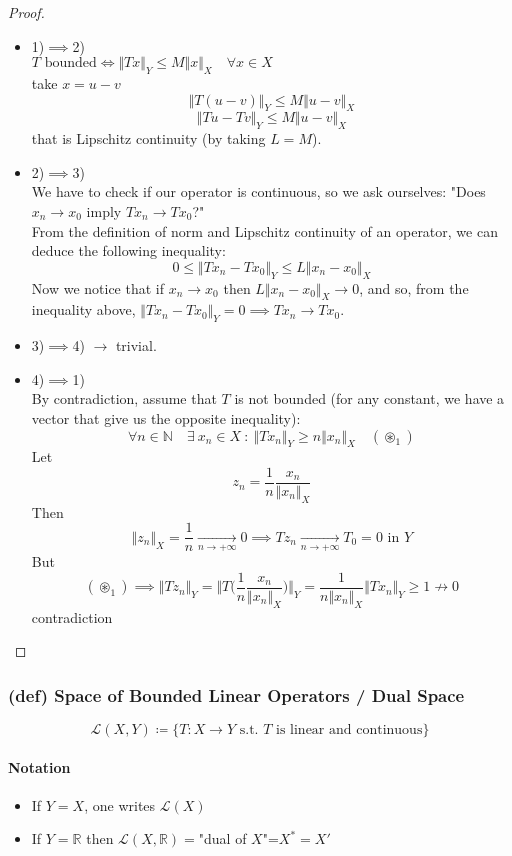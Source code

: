 \begin{proof}\
    \begin{itemize}
        \item  1)$\implies$2) \\$T \text{ bounded}\iff \Vert Tx\Vert _Y\leq M\Vert x\Vert _X\quad \forall x\in X$\\ take $x=u-v$
        $$\Vert T(u-v)\Vert_Y\leq M\Vert u-v\Vert _X$$
        $$\Vert Tu-Tv\Vert_Y\leq M\Vert u-v\Vert _X$$
        that is Lipschitz continuity (by taking $L=M$).
        \item 2)$\implies$3) \\
        We have to check if our operator is continuous, so we ask ourselves: "Does $x_n\to x_0$ imply $Tx_n\to Tx_0$?"\\
        From the definition of norm and Lipschitz continuity of an operator, we can deduce the following inequality:
        $$0\leq\Vert Tx_n-T x_0\Vert_Y \leq L\Vert x_n-x_0\Vert_X$$
        Now we notice that if $x_n\to x_0$ then $L\Vert x_n-x_0\Vert_X\to 0$, and so, from the inequality above, $\Vert Tx_n-T x_0\Vert_Y=0 \implies Tx_n\to Tx_0$.
        \item 3)$\implies$4) $\to $ trivial.
        \item 4)$\implies$1)\\
        By contradiction, assume that $T$ is not bounded (for any constant, we have a vector that give us the opposite inequality):
        $$\forall n\in \mathbb N\quad \exists\ x_n\in X\ : \ \Vert Tx_n\Vert_Y\geq n\Vert x_n\Vert _X \quad (\circledast_1)$$
        Let $$z_n= \frac 1n\frac{x_n}{\Vert x_n\Vert_X}$$
        Then 
        $$\Vert z_n\Vert _X=\frac 1n\xrightarrow[n\to+\infty]{} 0\implies Tz_n \xrightarrow[n\to+\infty]{}T_0=0 \text{ in }Y$$
        But $$(\circledast_1)\implies \Vert Tz_n\Vert_Y=\Big\Vert T\Big(\frac 1n \frac{x_n}{\Vert x_n\Vert_X}\Big)\Big\Vert_Y=\frac{1}{n\Vert x_n\Vert_X}\Vert T x_n\Vert_Y\geq 1 \not \to 0$$
        contradiction
        
    \end{itemize}
\end{proof}
\subsubsection{(def) Space of Bounded Linear Operators / Dual Space}
$$\mathcal L(X,Y)\coloneqq \Big\{ T:X\to Y \text{ s.t. } T \text{ is linear and continuous}\Big\}$$
\paragraph{Notation}
\begin{itemize}
    \item If $Y=X$, one writes $\mathcal L(X)$
    \item If $Y=\mathbb R$ then $\mathcal L(X,\mathbb R)=$"dual of $X$"=$X^*=X'$
\end{itemize}
